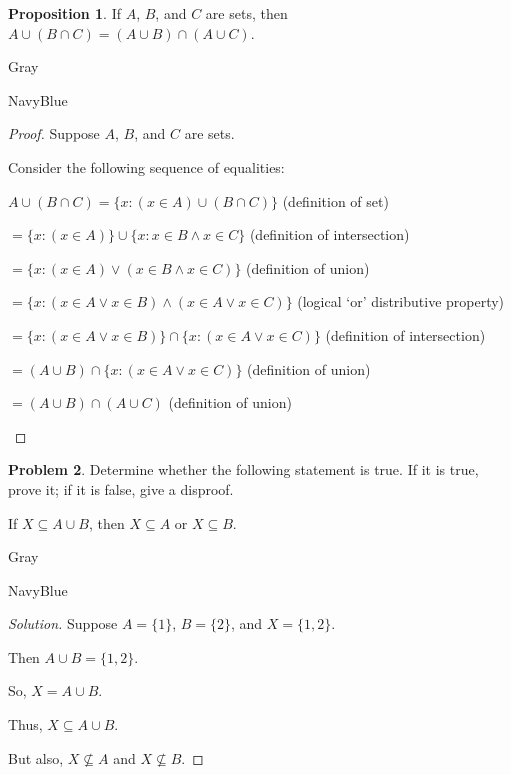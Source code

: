 \documentclass[12pt]{amsart}
\newcounter{problem_number}[section]
\theoremstyle{named}
\newenvironment{prf}
{\medskip\begin{color}{Gray}\begin{framed}\begin{color}{NavyBlue}\begin{proof}[Proof]
\doublespacing}
{\end{proof}\end{color}\end{framed}\end{color}\medskip}
\newenvironment{soln}
{\begin{color}{Gray}\begin{framed}\begin{color}{NavyBlue}\begin{proof}[Solution]
\doublespacing}
{\end{proof}\end{color}\end{framed}\end{color}}
\theoremstyle{definition}
\newtheorem{proposition}{Proposition}
\newtheorem{problem}[proposition]{Problem}
\begin{document}
\begin{proposition}
	If $A$, $B$, and $C$ are sets, then $A\cup(B\cap C) = (A\cup B)\cap(A\cup C)$.
	
\end{proposition}

\begin{prf}
	\phantom{ }

	Suppose $A$, $B$, and $C$ are sets.

	Consider the following sequence of equalities:

	\begin{adjustwidth}{2em}{0em}
		$A \cup (B \cap C) = \{x : (x \in A) \cup (B \cap C)\}$ \hfill (definition of set)

		$=\{x : (x \in A)\} \cup \{x: x \in B \land x \in C\}$ \hfill (definition of intersection)

		$=\{x : (x \in A) \lor (x \in B \land x \in C)\}$ \hfill (definition of union)

		$=\{x : (x \in A \lor x \in B) \land (x \in A \lor x \in C)\}$ \hfill (logical `or' distributive property)
	
		$=\{x : (x \in A \lor x \in B)\} \cap \{x: (x \in A \lor x \in C)\}$ \hfill (definition of intersection)
		
		$=(A \cup B) \cap \{x: (x \in A \lor x \in C)\}$ \hfill (definition of union)

		$=(A \cup B) \cap (A \cup C)$ \hfill (definition of union)
	
	\end{adjustwidth}

\end{prf}

\phantom{ }

\phantom{ }

\phantom{ }

\phantom{ }
\begin{problem}
	Determine whether the following statement is true.
	If it is true, prove it; if it is false, give a disproof.
	\begin{center}
		If $X\subseteq A\cup B$, then $X\subseteq A$ or $X\subseteq B$.
	\end{center}
\end{problem}

\begin{soln}
	\phantom{ }

	Suppose $A = \{1\}$, $B = \{2\}$, and $X = \{1,2\}$.

	Then $A \cup B = \{1, 2\}$.

	So, $X = A \cup B$.

	Thus, $X \subseteq A \cup B$.

	But also, $X \nsubseteq A$ and $X \nsubseteq B$.
\end{soln}
\end{document}
